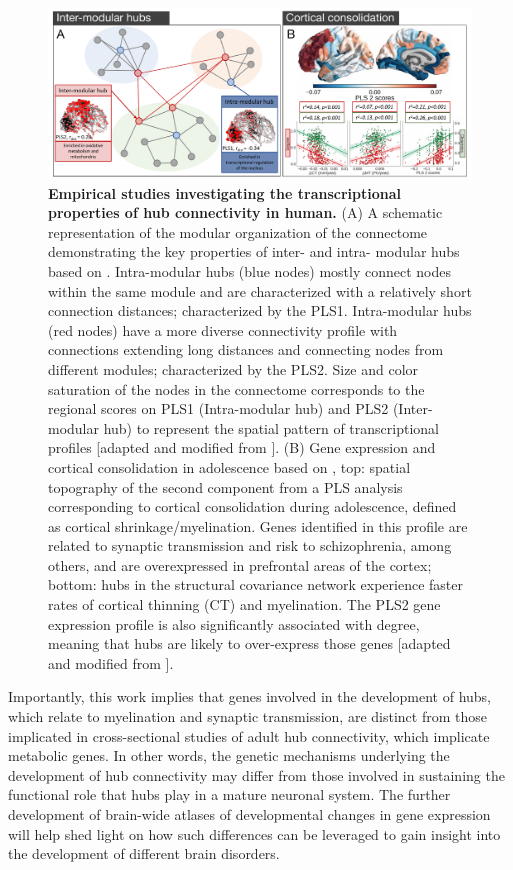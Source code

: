 \begin{figure}[H]
\begin{center}
\includegraphics[width=1\textwidth]{Chapter3/Ch3Fig4.pdf}%
\end{center}
\caption{\textbf{Empirical studies investigating the transcriptional properties of hub connectivity in human.}
(A) A schematic representation of the modular organization of the connectome demonstrating the key properties of inter- and intra- modular hubs based on \citet{Vertes2016b}.
Intra-modular hubs (blue nodes) mostly connect nodes within the same module and are characterized with a relatively short connection distances; characterized by the PLS1. Intra-modular hubs (red nodes) have a more diverse connectivity profile with connections extending long distances and connecting nodes from different modules; characterized by the PLS2. Size and color saturation of the nodes in the connectome corresponds to the regional scores on PLS1 (Intra-modular hub) and PLS2 (Inter-modular hub) to represent the spatial pattern of transcriptional profiles [adapted and modified from \citet{Vertes2016b}].
(B) Gene expression and cortical consolidation in adolescence based on \citet{Whitaker2016a},
top: spatial topography of the second component from a PLS analysis corresponding to cortical consolidation during adolescence, defined as cortical shrinkage/myelination. Genes identified in this profile are related to synaptic transmission and risk to schizophrenia, among others, and are overexpressed in prefrontal areas of the cortex; bottom: hubs in the structural covariance network experience faster rates of cortical thinning (CT) and myelination. The PLS2 gene expression profile is also significantly associated with degree, meaning that hubs are likely to over-express those genes [adapted and modified from \citet{Whitaker2016a}]. } \label{fig:Ch3Fig4}
\end{figure}

Importantly, this work implies that genes involved in the development of hubs, which relate to myelination and synaptic transmission, are distinct from those implicated in cross-sectional studies of adult hub connectivity, which implicate metabolic genes. In other words, the genetic mechanisms underlying the development of hub connectivity may differ from those involved in sustaining the functional role that hubs play in a mature neuronal system. The further development of brain-wide atlases of developmental changes in gene expression will help shed light on how such differences can be leveraged to gain insight into the development of different brain disorders.


